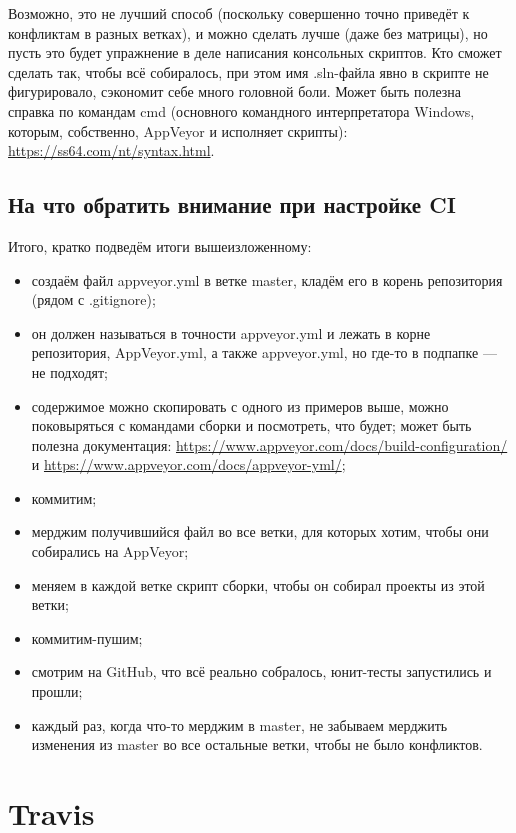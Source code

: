 \documentclass[a5paper]{article}
\begin{document}
Возможно, это не лучший способ (поскольку совершенно точно приведёт к конфликтам в разных ветках), и можно сделать лучше (даже без матрицы), но пусть это будет упражнение в деле написания консольных скриптов. Кто сможет сделать так, чтобы всё собиралось, при этом имя .sln-файла явно в скрипте не фигурировало, сэкономит себе много головной боли. Может быть полезна справка по командам cmd (основного командного интерпретатора Windows, которым, собственно, AppVeyor и исполняет скрипты): \url{https://ss64.com/nt/syntax.html}.

\subsection{На что обратить внимание при настройке CI}

Итого, кратко подведём итоги вышеизложенному:

\begin{itemize}
	\item создаём файл appveyor.yml в ветке master, кладём его в корень репозитория (рядом с .gitignore);
	\item он должен называться в точности appveyor.yml и лежать в корне репозитория, AppVeyor.yml, а также appveyor.yml, но где-то в подпапке --- не подходят;
	\item содержимое можно скопировать с одного из примеров выше, можно поковыряться с командами сборки и посмотреть, что будет; может быть полезна документация: \url{https://www.appveyor.com/docs/build-configuration/} и \url{https://www.appveyor.com/docs/appveyor-yml/};
	\item коммитим;
	\item мерджим получившийся файл во все ветки, для которых хотим, чтобы они собирались на AppVeyor;
	\item меняем в каждой ветке скрипт сборки, чтобы он собирал проекты из этой ветки;
	\item коммитим-пушим;
	\item смотрим на GitHub, что всё реально собралось, юнит-тесты запустились и прошли;
	\item каждый раз, когда что-то мерджим в master, не забываем мерджить изменения из master во все остальные ветки, чтобы не было конфликтов.
\end{itemize}

\section{Travis}
\end{document}
